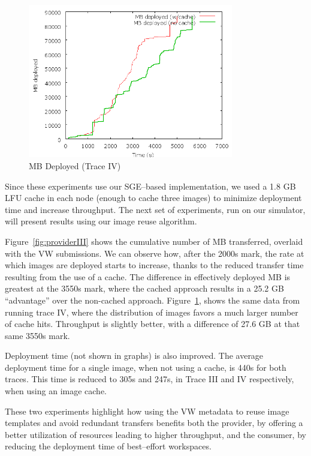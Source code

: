 \begin{figure}
  \begin{center}
    \includegraphics[width=0.8\textwidth]{figures/ProviderPerspective-Pareto2.png}
    \caption{MB Deployed (Trace IV)}
	\label{fig:providerIV}
  \end{center}
\end{figure}

Since these experiments use our SGE--based implementation, we used a 1.8 GB
LFU cache in each node (enough to cache three images) to minimize deployment time and increase throughput. The next set of experiments, run on our simulator, will present results using our image reuse algorithm.

Figure~\ref{fig:providerIII} shows
the cumulative number of MB transferred, overlaid with the VW
submissions. We can observe how, after the 2000s mark, the rate at
which images are deployed starts to increase, thanks to the reduced
transfer time resulting from the use of a cache. The difference in
effectively deployed MB is greatest at the 3550s mark, where the cached
approach results in a 25.2 GB ``advantage'' over the non{}-cached
approach. Figure~\ref{fig:providerIV}, shows the same data from running trace IV, where
the distribution of images favors a much larger number of cache hits.
Throughput is slightly better, with a difference of 27.6 GB at that
same 3550s mark.

Deployment time (not shown in graphs) is also improved. The average
deployment time for a single image, when not using a cache, is 440s for
both traces. This time is reduced to 305s and 247s, in Trace III and IV
respectively, when using an image cache.

These two experiments highlight how using the VW metadata to reuse image
templates and avoid redundant transfers benefits both the provider, by
offering a better utilization of resources leading to higher
throughput, and the consumer, by reducing the deployment time of best--effort
workspaces.


